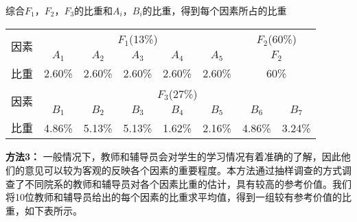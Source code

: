 \documentclass{ctexart}
\begin{document}
\newpage
综合$F_{1}$，$F_{2}$，$F_{3}$的比重和$A_{i}$，$B_{i}$的比重，得到每个因素所占的比重


\begin{table}[htbp]
\begin{tabular}{|c|c|c|c|c|c|c|c|}
\hline
\multirow{2}{*}{因素}&\multicolumn{5}{|c|}{$F_{1}$(13\%)}&\multicolumn{2}{|c|}{$F_{2}$(60\%)}\\
\cline{2-8}
&$A_{1}$	  &  $A_{2}$	 & $A_{3}$&$A_{4}$  & $A_{5}$& 	\multicolumn{2}{|c|}{$F_{2}$}\\
\hline
比重&2.60\%&	2.60\%	&2.60\%&	2.60\%	&2.60\%&\multicolumn{2}{|c|}{60\%}\\
\hline
\multirow{2}{*}{因素}&\multicolumn{7}{|c|}{$F_{3}$(27\%)}\\
\cline{2-8}
&$B_{1}$&$B_{2}$&$B_{3}$&$B_{4}$&$B_{5}$&$B_{6}$&$B_{7}$\\
\hline
比重&4.86\%&5.13\%&	5.13\%&	1.62\%&	2.16\%&	4.86\%&	3.24\%\\
\hline

\end{tabular}
\end{table}

\textbf{方法3：}
一般情况下，教师和辅导员会对学生的学习情况有着准确的了解，因此他们的意见可以较为客观的反映各个因素的重要程度。本方法通过抽样调查的方式调查了不同院系的教师和辅导员对各个因素比重的估计，具有较高的参考价值。我们将10位教师和辅导员给出的每个因素的比重求平均值，得到一组较有参考价值的比重，如下表所示。
\end{document}
